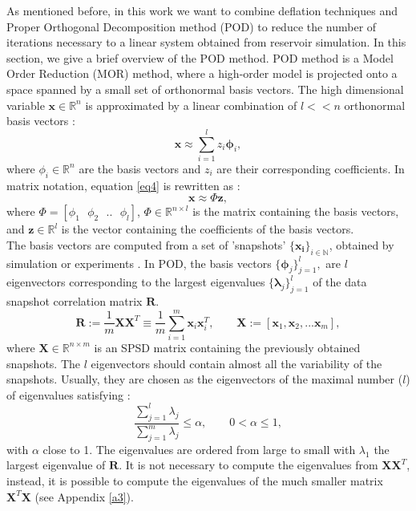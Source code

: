 \documentclass[12pt]{article}
\numberwithin{equation}{section}
\begin{document}
\hspace{0.5cm}
As mentioned before, in this work we want to combine deflation techniques and Proper Orthogonal Decomposition method (POD) to reduce the number of iterations necessary to a linear system obtained from reservoir simulation. In this section, we give a brief overview of the POD method.
POD method is a Model Order Reduction (MOR) method, where a high-order model is projected onto a space
spanned by a small set of orthonormal basis vectors.
The high dimensional variable $\mathbf{x} \in \mathbb{R}^n$
is approximated by a linear combination of $l<<n$ orthonormal basis vectors \cite{Astrid11}:
\begin{equation}\label{eq4}
  \mathbf{x}\approx \sum_{i=1}^lz_i \mathbf{\phi}_i,
\end{equation}
where $\phi_i \in \mathbb{R}^n$ are the basis vectors and $z_i$ are their corresponding coefficients.
In matrix notation, equation \eqref{eq4} is rewritten as :
$$\mathbf{x}\approx \Phi\mathbf{z},$$
where $\Phi=[\phi_1 \text{ }\phi_2 \text{ }.. \text{ }\phi_l]$, $\Phi \in \mathbb{R}^{n\times l}$ 
is the matrix containing the basis vectors, and $\mathbf{z} \in \mathbb{R}^l$ is the vector 
containing the coefficients of the basis vectors. \\
The basis vectors are computed from a set of 'snapshots' $\{ \mathbf{x_i}\} _{i\in \mathbb{N}}$, 
obtained by simulation or experiments \cite{Mark06}. 
In POD, the basis vectors $\{ \mathbf{\phi} _j \} ^l _{j=1},$ are $l$ eigenvectors corresponding to 
the largest eigenvalues $\{ \mathbf{\lambda} _j \} ^l _{j=1}$ of the data snapshot correlation matrix $\mathbf{R}$.
\begin{equation}\label{eq:POD}
\mathbf{R}:= \frac{1}{m}\mathbf{X}\mathbf{X}^T \equiv \frac{1}{m} \sum_{i=1}^m \mathbf{x}_i \mathbf{x}_i^T,
\qquad \mathbf{X}:=[\mathbf{x}_1,\mathbf{x}_2,...\mathbf{x}_m],
\end{equation}
where $\mathbf{X}\in \mathbb{R}^{n\times m}$ is an SPSD matrix containing the previously obtained snapshots.
The $l$ eigenvectors should contain almost all the variability of the snapshots. 
Usually, they are chosen as the eigenvectors of the maximal number ($l$) of eigenvalues satisfying \cite{Mark06}:
\begin{equation}
\frac{\sum_{j=1}^l\lambda_j}{\sum_{j=1}^m\lambda_j}\leq \alpha, \qquad 0<\alpha \leq 1,
\end{equation}
with $\alpha$ close to 1. The eigenvalues are ordered from large to small with $\lambda_1$
the largest eigenvalue of $\mathbf{R}$. 
It is not necessary to compute the eigenvalues from $\mathbf{X}\mathbf{X}^T$, instead, it is possible to compute the eigenvalues of the much smaller matrix $\mathbf{X}^T\mathbf{X}$ (see Appendix \ref{a3}).
\end{document}
